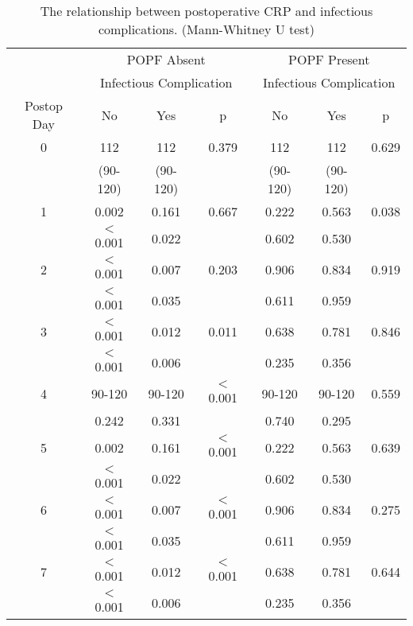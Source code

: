 \begin{table}[h]
	\centering
	\caption{The relationship between postoperative CRP and infectious complications. (Mann-Whitney U test)}
	\label{table:crp_comp_vs_infections_popf_y1n0}
	\begin{tabular}{| c | c c c | c c c |}
		\hline
		           &       \multicolumn{3}{c}{POPF Absent}       &      \multicolumn{3}{c}{POPF Present}       \\
		           & \multicolumn{3}{c}{Infectious Complication} & \multicolumn{3}{c}{Infectious Complication} \\
		Postop Day & No       & Yes      & p                     & No       & Yes      & p                     \\ \hline
		0          & 112      & 112      & 0.379                 & 112      & 112      & 0.629                 \\
		           & (90-120) & (90-120) &                       & (90-120) & (90-120) &  \\
		1          & 0.002    & 0.161    & 0.667                 & 0.222    & 0.563    & 0.038                 \\
		           & $<$0.001 & 0.022    &                       & 0.602    & 0.530    &  \\
		2          & $<$0.001 & 0.007    & 0.203                 & 0.906    & 0.834    & 0.919                 \\
		           & $<$0.001 & 0.035    &                       & 0.611    & 0.959    &  \\
		3          & $<$0.001 & 0.012    & 0.011                 & 0.638    & 0.781    & 0.846                 \\
		           & $<$0.001 & 0.006    &                       & 0.235    & 0.356    &  \\
		4          & 90-120   & 90-120   & $<$0.001              & 90-120   & 90-120   & 0.559                 \\
		           & 0.242    & 0.331    &                       & 0.740    & 0.295    &  \\
		5          & 0.002    & 0.161    & $<$0.001              & 0.222    & 0.563    & 0.639                 \\
		           & $<$0.001 & 0.022    &                       & 0.602    & 0.530    &  \\
		6          & $<$0.001 & 0.007    & $<$0.001              & 0.906    & 0.834    & 0.275                 \\
		           & $<$0.001 & 0.035    &                       & 0.611    & 0.959    &  \\
		7          & $<$0.001 & 0.012    & $<$0.001              & 0.638    & 0.781    & 0.644                 \\
		           & $<$0.001 & 0.006    &                       & 0.235    & 0.356    &  \\ \hline
	\end{tabular}
\end{table}